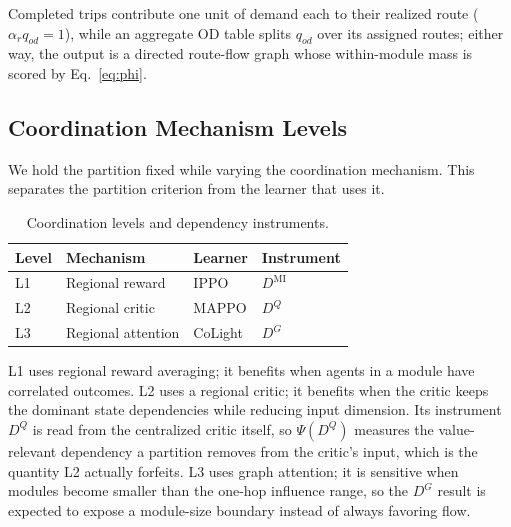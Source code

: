 \documentclass[journal]{IEEEtran}
\theoremstyle{definition}
\begin{document}
Completed trips contribute one unit of demand each to their realized route ($\alpha_r q_{od}=1$), while an aggregate OD table splits $q_{od}$ over its assigned routes; either way, the output is a directed route-flow graph whose within-module mass is scored by Eq.~\eqref{eq:phi}.

\subsection{Coordination Mechanism Levels}
\label{sec:levels}

We hold the partition fixed while varying the coordination mechanism.
This separates the partition criterion from the learner that uses it.

\begin{table}[t]
    \centering
    \caption{Coordination levels and dependency instruments.}
    \label{tab:levels}
    \footnotesize
    \begin{tabular}{llll}
        \toprule
        Level & Mechanism          & Learner & Instrument        \\
        \midrule
        L1    & Regional reward    & IPPO    & $D^{\mathrm{MI}}$ \\
        L2    & Regional critic    & MAPPO   & $D^{Q}$           \\
        L3    & Regional attention & CoLight & $D^{G}$           \\
        \bottomrule
    \end{tabular}
\end{table}

L1 uses regional reward averaging; it benefits when agents in a module have
correlated outcomes. L2 uses a regional critic; it benefits when the critic keeps the dominant state dependencies while reducing input dimension. Its instrument $D^{Q}$ is read from the centralized critic itself, so $\Psi(D^{Q})$ measures the value-relevant dependency a partition removes from the critic's input, which is the quantity L2 actually forfeits. L3 uses graph attention; it is sensitive when modules become smaller than the one-hop influence range, so the $D^G$ result is expected to expose a module-size boundary instead of always favoring flow.
\end{document}
